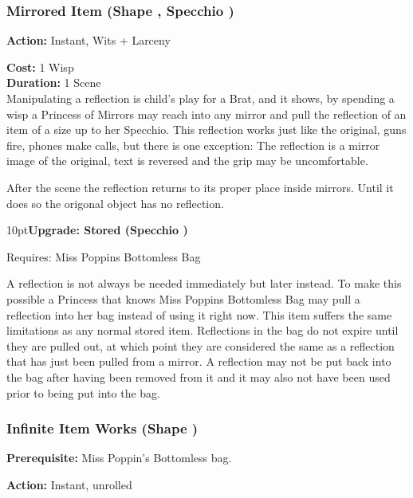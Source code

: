 \subsubsection*{Mirrored Item (Shape \textbullet, Specchio \textbullet)}

\noindent \textbf{Action:} Instant, Wits + Larceny

\noindent \textbf{Cost:} 1 Wisp \\

\noindent \textbf{Duration:} 1 Scene \\

Manipulating a reflection is child's play for a Brat, and it shows, by spending a wisp a Princess of Mirrors may reach into any mirror and pull the reflection of an item of a size up to her Specchio. This reflection works just like the original, guns fire, phones make calls, but there is one exception: The reflection is a mirror image of the original, text is reversed and the grip may be uncomfortable.

After the scene the reflection returns to its proper place inside mirrors. Until it does so the origonal object has no reflection.

\begin{myindentpar}{10pt}\textbf{Upgrade: Stored (Specchio \textbullet\textbullet)}

\noindent Requires: Miss Poppins Bottomless Bag

A reflection is not always be needed immediately but later instead. To make this possible a Princess that knows Miss Poppins Bottomless Bag may pull a reflection into her bag instead of using it right now. This item suffers the same limitations as any normal stored item. Reflections in the bag do not expire until they are pulled out, at which point they are considered the same as a reflection that has just been pulled from a mirror. A reflection may not be put back into the bag after having been removed from it and it may also not have been used prior to being put into the bag.\end{myindentpar}

\subsubsection*{Infinite Item Works (Shape \textbullet\textbullet)}

\noindent \textbf{Prerequisite:} Miss Poppin's Bottomless bag. 

\noindent \textbf{Action:} Instant, unrolled

